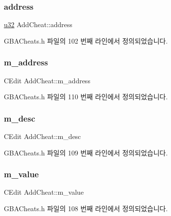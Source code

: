 \subsubsection{\texorpdfstring{address}{address}}
{\footnotesize\ttfamily \mbox{\hyperlink{_system_8h_a10e94b422ef0c20dcdec20d31a1f5049}{u32}} Add\+Cheat\+::address}



G\+B\+A\+Cheats.\+h 파일의 102 번째 라인에서 정의되었습니다.

\mbox{\label{class_add_cheat_a27ec0f498f3827cfc81c19d963c7fef5}} 
\subsubsection{\texorpdfstring{m\+\_\+address}{m\_address}}
{\footnotesize\ttfamily C\+Edit Add\+Cheat\+::m\+\_\+address}



G\+B\+A\+Cheats.\+h 파일의 110 번째 라인에서 정의되었습니다.

\mbox{\label{class_add_cheat_a644f29b6dd8a0d26d5050054bdf2b054}} 
\subsubsection{\texorpdfstring{m\+\_\+desc}{m\_desc}}
{\footnotesize\ttfamily C\+Edit Add\+Cheat\+::m\+\_\+desc}



G\+B\+A\+Cheats.\+h 파일의 109 번째 라인에서 정의되었습니다.

\mbox{\label{class_add_cheat_aff9c3fd61a088f03dba1eb01e6956286}} 
\subsubsection{\texorpdfstring{m\+\_\+value}{m\_value}}
{\footnotesize\ttfamily C\+Edit Add\+Cheat\+::m\+\_\+value}



G\+B\+A\+Cheats.\+h 파일의 108 번째 라인에서 정의되었습니다.

